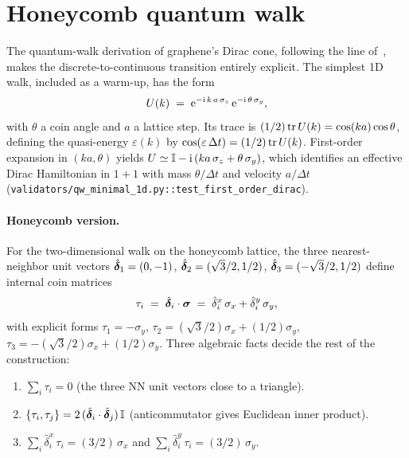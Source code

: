 \section{Honeycomb quantum walk}
\label{p:qw}

The quantum-walk derivation of graphene's Dirac cone, following the
line of~\cite{Arrighi2018,BisioDAriano2015}, makes the
discrete-to-continuous transition entirely explicit. The simplest 1D
walk, included as a warm-up, has the form
\begin{equation}
U(k) \;=\; \mathrm{e}^{-\mathrm{i}\,k\,a\,\sigma_{z}}\,\mathrm{e}^{-\mathrm{i}\,\theta\,\sigma_{y}} ,
\label{p:eq:U1Dminimal}
\end{equation}
with $\theta$ a coin angle and $a$ a lattice step. Its trace is
$(1/2)\operatorname{tr}U(k) = \cos(ka)\cos\theta$, defining the
quasi-energy $\varepsilon(k)$ by $\cos(\varepsilon\,\Delta t) = (1/2)\operatorname{tr}U(k)$.
First-order expansion in $(ka,\theta)$ yields
$U \simeq \mathbb{I} - \mathrm{i}\,(k a\,\sigma_{z} + \theta\,\sigma_{y})$,
which identifies an effective Dirac Hamiltonian in $1{+}1$ with mass
$\theta/\Delta t$ and velocity $a/\Delta t$
(\texttt{validators/qw\_minimal\_1d.py::test\_first\_order\_dirac}).

\paragraph{Honeycomb version.}
For the two-dimensional walk on the honeycomb lattice, the three
nearest-neighbor unit vectors $\hat{\bm{\delta}}_{1}=(0,-1)$,
$\hat{\bm{\delta}}_{2}=(\sqrt{3}/2,1/2)$,
$\hat{\bm{\delta}}_{3}=(-\sqrt{3}/2,1/2)$ define internal coin matrices
\begin{equation}
\tau_{i} \;=\; \hat{\bm{\delta}}_{i}\cdot\bm{\sigma} \;=\;
\hat{\delta}_{i}^{x}\,\sigma_{x} + \hat{\delta}_{i}^{y}\,\sigma_{y} ,
\end{equation}
with explicit forms
$\tau_{1} = -\sigma_{y}$,
$\tau_{2} = (\sqrt{3}/2)\sigma_{x}+(1/2)\sigma_{y}$,
$\tau_{3} = -(\sqrt{3}/2)\sigma_{x}+(1/2)\sigma_{y}$. Three algebraic
facts decide the rest of the construction:

\begin{enumerate}[leftmargin=*]
\item $\sum_{i}\tau_{i} = 0$ (the three NN unit vectors close to a
triangle).
\item $\{\tau_{i},\tau_{j}\}=2\,(\hat{\bm{\delta}}_{i}\cdot\hat{\bm{\delta}}_{j})\,\mathbb{I}$
(anticommutator gives Euclidean inner product).
\item $\sum_{i}\hat{\delta}_{i}^{x}\,\tau_{i} = (3/2)\,\sigma_{x}$ and
$\sum_{i}\hat{\delta}_{i}^{y}\,\tau_{i} = (3/2)\,\sigma_{y}$.
\end{enumerate}


